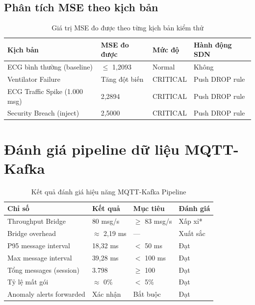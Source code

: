 \subsection{Phân tích MSE theo kịch bản}

\begin{table}[htbp]
\caption{Giá trị MSE đo được theo từng kịch bản kiểm thử}
\label{tab:mse_values}
\centering
\begin{tabular}{llll}
\toprule
\textbf{Kịch bản} & \textbf{MSE đo được} & \textbf{Mức độ} & \textbf{Hành động SDN} \\
\midrule
ECG bình thường (baseline) & $\leq$ 1,2093       & Normal   & Không \\
Ventilator Failure          & Tăng đột biến       & CRITICAL & Push DROP rule \\
ECG Traffic Spike (1.000 msg) & 2,2894           & CRITICAL & Push DROP rule \\
Security Breach (inject)    & 2,5000              & CRITICAL & Push DROP rule \\
\bottomrule
\end{tabular}
\end{table}

\section{Đánh giá pipeline dữ liệu MQTT-Kafka}

\begin{table}[htbp]
\caption{Kết quả đánh giá hiệu năng MQTT-Kafka Pipeline}
\label{tab:kafka_perf}
\centering
\begin{tabular}{llll}
\toprule
\textbf{Chỉ số} & \textbf{Kết quả} & \textbf{Mục tiêu} & \textbf{Đánh giá} \\
\midrule
Throughput Bridge          & 80 msg/s         & $\geq$ 83 msg/s & Xấp xỉ* \\
Bridge overhead            & $\approx$ 2,19 ms & —              & Xuất sắc \\
P95 message interval       & 18,32 ms         & $<$ 50 ms       & Đạt \\
Max message interval       & 39,28 ms         & $<$ 100 ms      & Đạt \\
Tổng messages (session)    & 3.798            & $\geq$ 100      & Đạt \\
Tỷ lệ mất gói              & $\approx$ 0\%    & $<$ 5\%         & Đạt \\
Anomaly alerts forwarded   & Xác nhận         & Bắt buộc        & Đạt \\
\bottomrule
\end{tabular}
\end{table}

